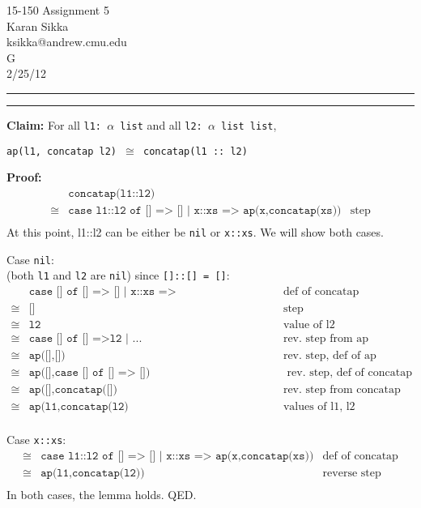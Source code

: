 \documentclass[11pt,letterpaper]{article}
\makeatletter
\newcommand{\question}[2] {\vspace{.25in} \hrule\vspace{0.5em}
\noindent{\bf #1: #2} \vspace{0.5em}
\hrule \vspace{.10in}}
\newcommand{\myname}{Karan Sikka}
\newcommand{\myandrew}{ksikka@andrew.cmu.edu}
\newcommand{\myhwnum}{5}
\makeatother
\begin{document}
\medskip

\thispagestyle{plain}
\begin{center}                  %
{\Large 15-150 Assignment \myhwnum} \\
\myname \\
\myandrew \\
G \\
2/25/12 \\
\end{center}


\question{1}{Task 2.2}
\textbf{Claim:} For all \texttt{l1: $\alpha$ list} and all \texttt{l2: 
$\alpha$ list list}, 
  \begin{center}
    \texttt{ap(l1, concatap l2) $\cong$ concatap(l1 :: l2)}
  \end{center}

\textbf{Proof:}\\
\begin{align*}
     & \texttt{concatap(l1::l2)} &\\ 
\cong& \texttt{case l1::l2 of [] => [] | x::xs => ap(x,concatap(xs))} & \text{step}\\
\end{align*}
At this point, l1::l2 can be either be \texttt{nil} or \texttt{x::xs}. We will show 
both cases.

Case \texttt{nil}:\\
(both \texttt{l1} and \texttt{l2} are \texttt{nil}) since \texttt{[]::[] = []}:
\begin{align*}
      & \texttt{case [] of [] => [] | x::xs => ap(x,concatap(xs))} & \text{def of concatap}\\
\cong & \texttt{[]} & \text{step}\\
\cong & \texttt{l2} & \text{value of l2}\\
\cong & \texttt{case [] of [] =>l2 | ...} & \text{rev. step from ap}\\
\cong & \texttt{ap([],[])} & \text{rev. step, def of ap}\\
\cong & \texttt{ap([],case [] of [] => [])} & \text{ rev. step, def of concatap}\\
\cong & \texttt{ap([],concatap([])} & \text{rev. step from concatap}\\
\cong & \texttt{ap(l1,concatap(l2)} & \text{values of l1, l2}\\
\end{align*}

Case \texttt{x::xs}:
\begin{align*}
\cong& \texttt{case l1::l2 of [] => [] | x::xs => ap(x,concatap(xs))} & \text{def of concatap}\\
\cong& \texttt{ap(l1,concatap(l2))} & \text{reverse step}\\
\end{align*}
In both cases, the lemma holds. QED.
\end{document}
